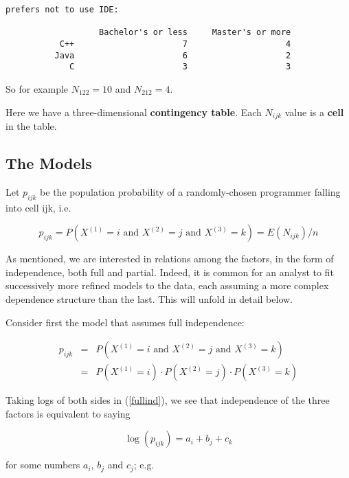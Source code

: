 \begin{Verbatim}[fontsize=\relsize{-2}]
prefers not to use IDE:

                   Bachelor's or less     Master's or more
           C++                      7                    4
          Java                      6                    2
             C                      3                    3
\end{Verbatim}

So for example $N_{122} = 10$ and $N_{212} = 4$.

Here we have a three-dimensional {\bf contingency table}.  Each $N_{ijk}$
value is a {\bf cell} in the table.

\subsection{The Models}

Let $p_{ijk}$ be the population probability of a randomly-chosen
programmer falling into cell ijk, i.e.

\begin{equation}
p_{ijk} 
= P \left ( X^{(1)} = i \textrm{ and } X^{(2)} = j \textrm{ and } X^{(3)} = k \right ) 
= E(N_{ijk}) / n
\end{equation}

As mentioned, we are interested in relations among the factors, in the
form of independence, both full and partial.  Indeed, it is common for
an analyst to fit successively more refined models to the data, each
assuming a more complex dependence structure than the last.  This will
unfold in detail below.

Consider first the model that assumes full independence:

\begin{eqnarray}
p_{ijk} &=&
P \left ( X^{(1)} = i \textrm{ and } X^{(2)} = j \textrm{ and } X^{(3)} = k \right ) \\ 
&=& P \left ( X^{(1)} = i \right )
\cdot P \left ( X^{(2)} = j \right )
\cdot P \left ( X^{(3)} = k \right ) 
\label{fullind}
\end{eqnarray}

Taking logs of both sides in (\ref{fullind}), we see that independence
of the three factors is equivalent to saying 

\begin{equation}
\label{abc}
\log(p_{ijk}) = a_i + b_j + c_k
\end{equation}

for some numbers $a_i$, $b_j$ and $c_j$; e.g.


